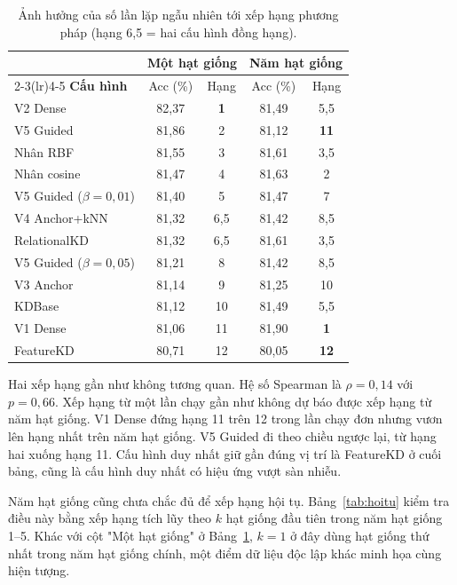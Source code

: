 \begin{table}[!htbp]
\centering
\caption{Ảnh hưởng của số lần lặp ngẫu nhiên tới xếp hạng phương pháp
(hạng 6,5 = hai cấu hình đồng hạng).}
\label{tab:daohang}
\begin{tabular}{lcccc}
\toprule
& \multicolumn{2}{c}{\textbf{Một hạt giống}} & \multicolumn{2}{c}{\textbf{Năm hạt giống}} \\
\cmidrule(lr){2-3}\cmidrule(lr){4-5}
\textbf{Cấu hình} & Acc (\%) & Hạng & Acc (\%) & Hạng \\
\midrule
V2 Dense & 82,37 & \textbf{1} & 81,49 & 5,5 \\
V5 Guided & 81,86 & 2 & 81,12 & \textbf{11} \\
Nhân RBF & 81,55 & 3 & 81,61 & 3,5 \\
Nhân cosine & 81,47 & 4 & 81,63 & 2 \\
V5 Guided ($\beta = 0{,}01$) & 81,40 & 5 & 81,47 & 7 \\
V4 Anchor+kNN & 81,32 & 6,5 & 81,42 & 8,5 \\
RelationalKD & 81,32 & 6,5 & 81,61 & 3,5 \\
V5 Guided ($\beta = 0{,}05$) & 81,21 & 8 & 81,42 & 8,5 \\
V3 Anchor & 81,14 & 9 & 81,25 & 10 \\
KDBase & 81,12 & 10 & 81,49 & 5,5 \\
V1 Dense & 81,06 & 11 & 81,90 & \textbf{1} \\
FeatureKD & 80,71 & 12 & 80,05 & \textbf{12} \\
\bottomrule
\end{tabular}
\end{table}
\FloatBarrier

Hai xếp hạng gần như không tương quan. Hệ số Spearman là $\rho = 0{,}14$
với $p = 0{,}66$. Xếp hạng từ một lần chạy gần như không dự báo được xếp
hạng từ năm hạt giống. V1 Dense đứng hạng 11 trên 12 trong lần chạy đơn
nhưng vươn lên hạng nhất trên năm hạt giống. V5 Guided đi theo chiều ngược
lại, từ hạng hai xuống hạng 11. Cấu hình duy nhất giữ gần đúng vị trí là
FeatureKD ở cuối bảng, cũng là cấu hình duy nhất có hiệu ứng vượt sàn nhiễu.

Năm hạt giống cũng chưa chắc đủ để xếp hạng hội tụ. Bảng~\ref{tab:hoitu}
kiểm tra điều này bằng xếp hạng tích lũy theo $k$ hạt giống đầu tiên trong
năm hạt giống 1--5. Khác với cột "Một hạt giống" ở Bảng~\ref{tab:daohang},
$k=1$ ở đây dùng hạt giống thứ nhất trong năm hạt giống chính, một điểm dữ
liệu độc lập khác minh họa cùng hiện tượng.

